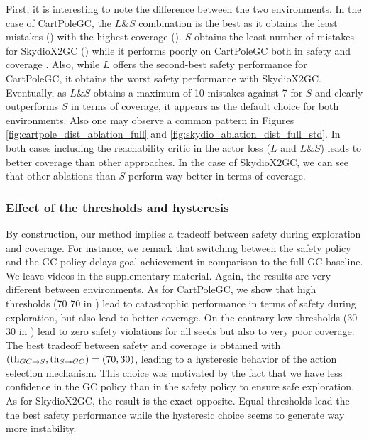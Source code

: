First, it is interesting to note the difference between the two environments. In the case of CartPoleGC, 
the $L\&S$ combination is the best as it obtains the least mistakes () 
with the highest coverage (). $S$ obtains the least 
number of mistakes for SkydioX2GC () 
while it performs poorly on CartPoleGC both in safety and coverage .
Also, while $L$ offers the second-best safety performance for CartPoleGC, it obtains the worst safety performance 
with SkydioX2GC. Eventually, as $L\&S$ obtains a maximum of 10 mistakes against 7 for $S$ and clearly outperforms 
$S$ in terms of coverage, it appears as the default choice for both environments.
Also one may observe a common pattern in Figures \ref{fig:cartpole_dist_ablation_full} and 
\ref{fig:skydio_ablation_dist_full_std}. In both cases including the reachability critic in the actor loss
($L$ and $L\&S$) leads to better coverage than other approaches.
In the case of SkydioX2GC, we can see that other ablations than $S$ perform way better in terms of coverage.

\subsubsection{Effect of the thresholds and hysteresis}

By construction, our method implies a tradeoff between safety during exploration and coverage.
For instance, we remark that switching between the safety policy and the GC policy delays 
goal achievement in comparison to the full GC baseline. We leave videos in the supplementary material.
Again, the results are very different between environments. As for CartPoleGC, we show that high thresholds
(70 70 in )
lead to catastrophic performance in terms of safety during exploration, but also lead to
better coverage. On the contrary low thresholds (30 30 in )
lead to zero safety violations for all seeds but also to very poor coverage.
The best tradeoff between safety and coverage is obtained with $(\text{th}_{GC \rightarrow S}, \text{th}_{S \rightarrow GC}) = (70, 30)$,
leading to a hysteresic behavior of the action selection mechanism. This choice was motivated by the 
fact that we have less confidence in the GC policy than in the safety policy to ensure safe exploration.
As for SkydioX2GC, the result is the exact opposite. Equal thresholds lead the the best safety performance 
while the hysteresic choice seems to generate way more instability.

